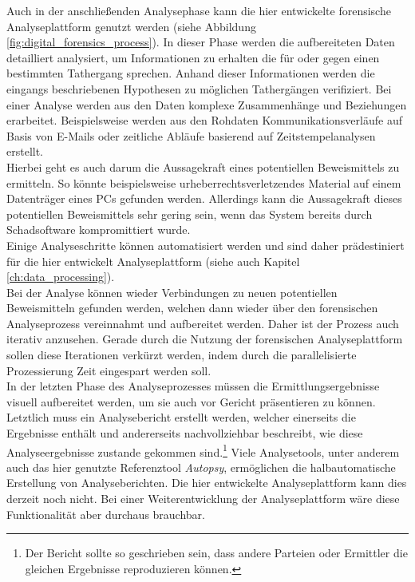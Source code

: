 \noindent
Auch in der anschließenden Analysephase kann die hier entwickelte forensische Analyseplattform genutzt werden (siehe Abbildung \ref{fig:digital_forensics_process}). In dieser Phase werden die aufbereiteten Daten detailliert analysiert, um Informationen zu erhalten die für oder gegen einen bestimmten Tathergang sprechen.\cite[S. 39-45]{digital_forensics} Anhand dieser Informationen werden die eingangs beschriebenen Hypothesen zu möglichen Tathergängen verifiziert. Bei einer Analyse werden aus den Daten komplexe Zusammenhänge und Beziehungen erarbeitet. Beispielsweise werden aus den Rohdaten Kommunikationsverläufe auf Basis von E-Mails oder zeitliche Abläufe basierend auf Zeitstempelanalysen erstellt.\cite[S. 33-39]{digital_forensics}\\
Hierbei geht es auch darum die Aussagekraft eines potentiellen Beweismittels zu ermitteln. So könnte beispielsweise urheberrechtsverletzendes Material auf einem Datenträger eines PCs gefunden werden. Allerdings kann die Aussagekraft dieses potentiellen Beweismittels sehr gering sein, wenn das System bereits durch Schadsoftware kompromittiert wurde.\\
Einige Analyseschritte können automatisiert werden und sind daher prädestiniert für die hier entwickelt Analyseplattform (siehe auch Kapitel \ref{ch:data_processing}).\\

\noindent
Bei der Analyse können wieder Verbindungen zu neuen potentiellen Beweismitteln gefunden werden, welchen dann wieder über den forensischen Analyseprozess vereinnahmt und aufbereitet werden. Daher ist der Prozess auch iterativ anzusehen. Gerade durch die Nutzung der forensischen Analyseplattform sollen diese Iterationen verkürzt werden, indem durch die parallelisierte Prozessierung Zeit eingespart werden soll.\\

\noindent
In der letzten Phase des Analyseprozesses müssen die Ermittlungsergebnisse visuell aufbereitet werden, um sie auch vor Gericht präsentieren zu können. Letztlich muss ein Analysebericht erstellt werden, welcher einerseits die Ergebnisse enthält und andererseits nachvollziehbar beschreibt, wie diese Analyseergebnisse zustande gekommen sind.\footnote{Der Bericht sollte so geschrieben sein, dass andere Parteien oder Ermittler die gleichen Ergebnisse reproduzieren können.}\cite[S. 45-47]{digital_forensics} Viele Analysetools, unter anderem auch das hier genutzte Referenztool \textit{Autopsy}, ermöglichen die halbautomatische Erstellung von Analyseberichten. Die hier entwickelte Analyseplattform kann dies derzeit noch nicht. Bei einer Weiterentwicklung der Analyseplattform wäre diese Funktionalität aber durchaus brauchbar.\\

